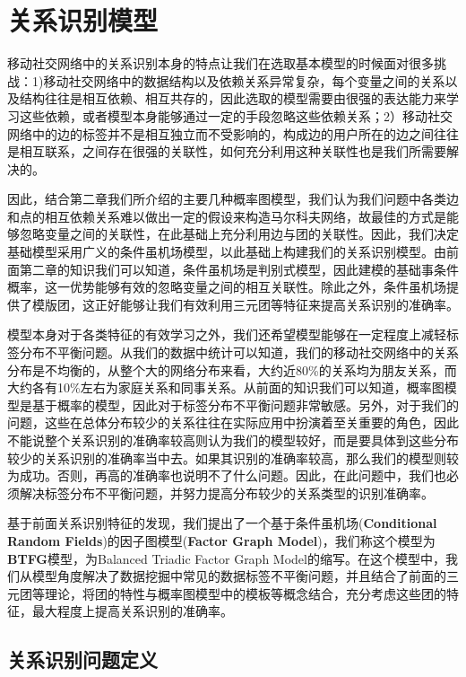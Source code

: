 \chapter{关系识别模型}
\qquad 移动社交网络中的关系识别本身的特点让我们在选取基本模型的时候面对很多挑战：1)移动社交网络中的数据结构以及依赖关系异常复杂，每个变量之间的关系以及结构往往是相互依赖、相互共存的，因此选取的模型需要由很强的表达能力来学习这些依赖，或者模型本身能够通过一定的手段忽略这些依赖关系；2）移动社交网络中的边的标签并不是相互独立而不受影响的，构成边的用户所在的边之间往往是相互联系，之间存在很强的关联性，如何充分利用这种关联性也是我们所需要解决的。

因此，结合第二章我们所介绍的主要几种概率图模型，我们认为我们问题中各类边和点的相互依赖关系难以做出一定的假设来构造马尔科夫网络，故最佳的方式是能够忽略变量之间的关联性，在此基础上充分利用边与团的关联性。因此，我们决定基础模型采用广义的条件虽机场模型，以此基础上构建我们的关系识别模型。由前面第二章的知识我们可以知道，条件虽机场是判别式模型，因此建模的基础事条件概率，这一优势能够有效的忽略变量之间的相互关联性。除此之外，条件虽机场提供了模版团，这正好能够让我们有效利用三元团等特征来提高关系识别的准确率。


模型本身对于各类特征的有效学习之外，我们还希望模型能够在一定程度上减轻标签分布不平衡问题。从我们的数据中统计可以知道，我们的移动社交网络中的关系分布是不均衡的，从整个大的网络分布来看，大约近80\%的关系均为朋友关系，而大约各有10\%左右为家庭关系和同事关系。从前面的知识我们可以知道，概率图模型是基于概率的模型，因此对于标签分布不平衡问题非常敏感。另外，对于我们的问题，这些在总体分布较少的关系往往在实际应用中扮演着至关重要的角色，因此不能说整个关系识别的准确率较高则认为我们的模型较好，而是要具体到这些分布较少的关系识别的准确率当中去。如果其识别的准确率较高，那么我们的模型则较为成功。否则，再高的准确率也说明不了什么问题。因此，在此问题中，我们也必须解决标签分布不平衡问题，并努力提高分布较少的关系类型的识别准确率。



基于前面关系识别特征的发现，我们提出了一个基于条件虽机场(\textbf{Conditional Random Fields})的因子图模型(\textbf{Factor Graph Model})，我们称这个模型为\textbf{BTFG}模型，为Balanced Triadic Factor Graph Model的缩写。在这个模型中，我们从模型角度解决了数据挖掘中常见的数据标签不平衡问题，并且结合了前面的三元团等理论，将团的特性与概率图模型中的模板等概念结合，充分考虑这些团的特征，最大程度上提高关系识别的准确率。


\section{关系识别问题定义}


